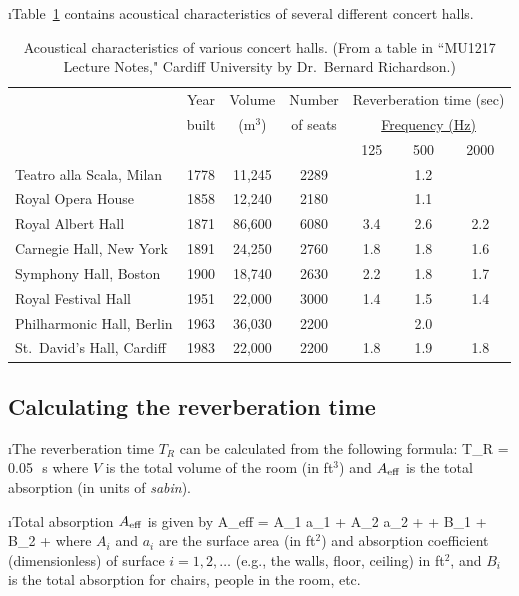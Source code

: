\i Table~\ref{t:concert_halls} contains 
acoustical characteristics of several different concert halls.
%
\begin{table}[htbp]
\begin{center}
\begin{tabular}{l c c c c c c}
\hline
& Year & Volume & Number & \multicolumn{3}{c}{Reverberation time (sec)}\\
& built & (m${}^3$) & of seats &\multicolumn{3}{c}{\underline{Frequency (Hz)}} \\
&       &           &          & 125 & 500 & 2000 \\
\hline
Teatro alla Scala, Milan  & 1778 & 11,245 & 2289 &     & 1.2 &     \\
Royal Opera House         & 1858 & 12,240 & 2180 &     & 1.1 &     \\
Royal Albert Hall         & 1871 & 86,600 & 6080 & 3.4 & 2.6 & 2.2 \\
Carnegie Hall, New York   & 1891 & 24,250 & 2760 & 1.8 & 1.8 & 1.6 \\
Symphony Hall, Boston     & 1900 & 18,740 & 2630 & 2.2 & 1.8 & 1.7 \\
Royal Festival Hall       & 1951 & 22,000 & 3000 & 1.4 & 1.5 & 1.4 \\
Philharmonic Hall, Berlin & 1963 & 36,030 & 2200 &     & 2.0 &     \\
St.\ David's Hall, Cardiff& 1983 & 22,000 & 2200 & 1.8 & 1.9 & 1.8 \\
\hline
\end{tabular}
\caption{Acoustical characteristics of various
concert halls.
(From a table in
``MU1217 Lecture Notes," Cardiff University
by Dr.~Bernard Richardson.)}
\label{t:concert_halls}
\end{center}
\end{table}
%

\ei
\subsection{Calculating the reverberation time}

\bi

\i The reverberation time $T_R$ can be calculated from 
the following formula:
%
\be
T_R = 0.05\,~{\rm s}
\ee
%
where $V$ is the total volume of the room (in ft${}^3$)
and $A_{\rm eff}$ is the total absorption (in units of {\em sabin}).

\i Total absorption $A_{\rm eff}$ is given by
%
\be
A_{\rm eff} = A_1 a_1 + A_2 a_2 + \cdots + B_1 + B_2 + \cdots
\ee
%
where $A_i$ and $a_i$ are the surface area (in ft$^2$) 
and absorption coefficient (dimensionless) of surface 
$i=1,2,\dots$
(e.g., the walls, floor, ceiling) in ft$^2$, 
and $B_i$ is the total absorption for chairs, people
in the room, etc.

